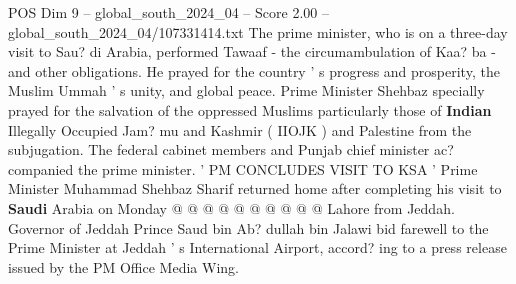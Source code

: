 \begin{textsample}{POS Dim 9 – global\_south\_2024\_04 – Score 2.00 – global\_south\_2024\_04/107331414.txt}
The prime minister, who is on a three-day visit to Sau? di Arabia, performed Tawaaf - the circumambulation of Kaa? ba - and other obligations.
He prayed for the country ' s progress and prosperity, the Muslim Ummah ' s unity, and global peace.
Prime Minister Shehbaz specially prayed for the salvation of the oppressed Muslims particularly those of \textbf{Indian} Illegally Occupied Jam? mu and Kashmir ( IIOJK ) and Palestine from the subjugation.
The federal cabinet members and Punjab chief minister ac? companied the prime minister. ' PM CONCLUDES VISIT TO KSA ' Prime Minister Muhammad Shehbaz Sharif returned home after completing his visit to \textbf{Saudi} Arabia on Monday @ @ @ @ @ @ @ @ @ @ Lahore from Jeddah.
Governor of Jeddah Prince Saud bin Ab? dullah bin Jalawi bid farewell to the Prime Minister at Jeddah ' s International Airport, accord? ing to a press release issued by the PM Office Media Wing.

\end{textsample}
